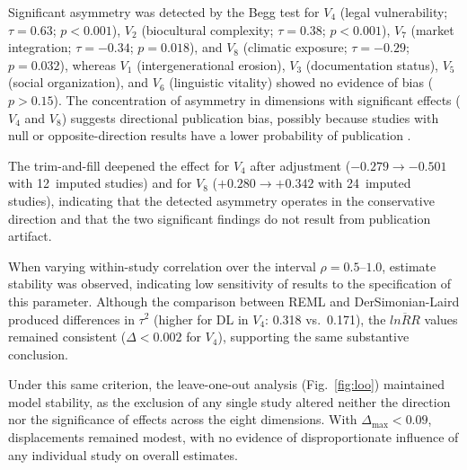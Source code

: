 \documentclass[12pt,a4paper]{article}
\begin{document}
Significant asymmetry was detected by the Begg test for $V_4$ (legal vulnerability; $\tau = 0.63$; $p < 0.001$), $V_2$ (biocultural complexity; $\tau = 0.38$; $p < 0.001$), $V_7$ (market integration; $\tau = -0.34$; $p = 0.018$), and $V_8$ (climatic exposure; $\tau = -0.29$; $p = 0.032$), whereas $V_1$ (intergenerational erosion), $V_3$ (documentation status), $V_5$ (social organization), and $V_6$ (linguistic vitality) showed no evidence of bias ($p > 0.15$). The concentration of asymmetry in dimensions with significant effects ($V_4$ and $V_8$) suggests directional publication bias, possibly because studies with null or opposite-direction results have a lower probability of publication \citep{Song2010}.

The trim-and-fill deepened the effect for $V_4$ after adjustment ($-0.279 \to -0.501$ with 12~imputed studies) and for $V_8$ ($+0.280 \to +0.342$ with 24~imputed studies), indicating that the detected asymmetry operates in the conservative direction and that the two significant findings do not result from publication artifact.

When varying within-study correlation over the interval $\rho = 0.5\text{--}1.0$, estimate stability was observed, indicating low sensitivity of results to the specification of this parameter. Although the comparison between REML and DerSimonian-Laird produced differences in $\tau^2$ (higher for DL in $V_4$: 0.318 vs.\ 0.171), the $\overline{lnRR}$ values remained consistent ($\Delta < 0.002$ for $V_4$), supporting the same substantive conclusion.

Under this same criterion, the leave-one-out analysis (Fig.~\ref{fig:loo}) maintained model stability, as the exclusion of any single study altered neither the direction nor the significance of effects across the eight dimensions. With $\Delta_{\max} < 0.09$, displacements remained modest, with no evidence of disproportionate influence of any individual study on overall estimates.
\end{document}
